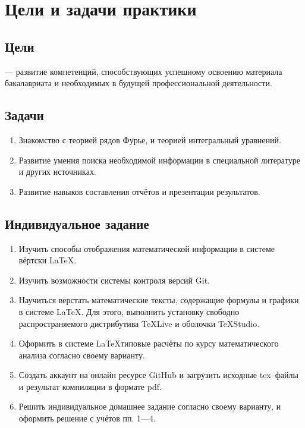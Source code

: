 \documentclass{article}
\begin{document}


\newpage	
\tableofcontents

\newpage
\section{Цели и задачи практики}	
\subsection{Цели}
--- развитие компетенций, способствующих успешному освоению материала бакалавриата и необходимых в будущей профессиональной деятельности.

\subsection{Задачи}
\begin{enumerate}
\item Знакомство с теорией рядов Фурье, и теорией интегральный уравнений.
\item Развитие умения поиска необходимой информации в специальной литературе и других источниках.
\item Развитие навыков составления отчётов и презентации результатов.
\end{enumerate}

\subsection{Индивидуальное задание}	
\begin{enumerate}
\item Изучить способы отображения математической информации в системе вёртски \LaTeX.
\item Изучить возможности  системы контроля версий \textsf{Git}.
\item Научиться верстать математические тексты, содержащие формулы и графики в системе \LaTeX.
Для этого, выполнить установку свободно распространяемого дистрибутива \textsf{TeXLive} и оболочки \textsf{TeXStudio}.
\item Оформить в системе \LaTeX типовые расчёты по курсу математического анализа согласно своему варианту.
\item Создать аккаунт на онлайн ресурсе \textsf{GitHub} и загрузить исходные \textsf{tex}--файлы 
и результат компиляции в формате \textsf{pdf}.
\item Решить индивидуальное домашнее задание согласно своему варианту, и оформить решение с учётов пп. 1---4.
\end{enumerate} 
\end{document}
